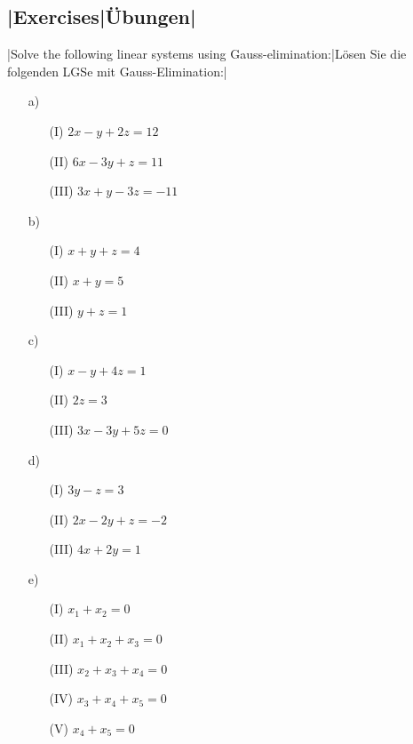 \subsection{\tr|Exercises|Übungen|}
\begin{exer} \label{Uebungen2}

\tr|Solve the following linear systems using Gauss-elimination:|Lösen Sie die folgenden LGSe mit Gauss-Elimination:|
\begin{itemize}
\item[a)] 
\begin{itemize}
\item[(I)] $2x-y+2z=12$
\item[(II)] $6x-3y+z=11$
\item[(III)] $3x+y-3z=-11$
\end{itemize}
\vsp

\item[b)] \begin{itemize}
\item[(I)] $x+y+z=4$
\item[(II)] $x+y=5$
\item[(III)] $y+z=1$
\end{itemize}
\vsp

\item[c)]
\begin{itemize}
 \item[(I)] $x-y+4z=1$
\item[(II)] $2z=3$
\item[(III)] $3x-3y+5z=0$
\end{itemize}
\vsp

\item[d)]
\begin{itemize}
\item[(I)] $3y-z=3$
\item[(II)] $2x-2y+z=-2$
\item[(III)] $4x+2y=1$
\end{itemize}
\vsp

\item[e)]
\begin{itemize}
\item[(I)] $x_1+x_2=0$
\item[(II)] $x_1+x_2+x_3=0$
\item[(III)]  $x_2+x_3+x_4=0$
\item[(IV)] $x_3+x_4+x_5=0$
\item[(V)] $x_4+x_5=0$
\end{itemize}


\end{itemize}
\end{exer}
